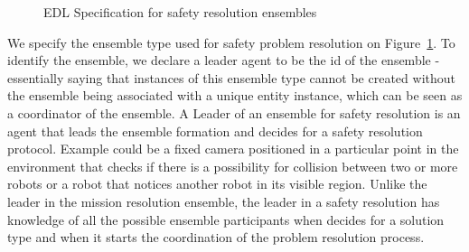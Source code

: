 \documentclass[journal]{IEEEtran}
\theoremstyle{definition}
\newcommand\patrizio[1]{\nb{Patrizio}{#1}}
\begin{document}
\begin{center}
\begin{figure}[!h]
 
%  
 \caption{EDL Specification for safety resolution ensembles} 
 \label {lstSafety}
 \vspace{-0.8cm}
\end{figure} 
\end{center} 
We  specify the ensemble  type  used  for  safety  problem resolution on Figure~\ref{lstSafety}. To identify the ensemble, we declare a leader  agent  to  be  the  id  of  the  ensemble - essentially saying that instances of this ensemble type cannot be created without the ensemble being associated with a unique entity instance, which can be seen as a coordinator of the ensemble. 
A Leader of an ensemble for safety resolution is an agent that leads the ensemble formation and decides for a safety resolution protocol.
Example could be a fixed camera positioned in a particular point in the environment that checks if there is a possibility for collision between two or more robots or a robot that notices another robot in its visible region. Unlike the leader in the mission resolution ensemble, the leader in a safety resolution has knowledge of all the possible ensemble participants when decides for a solution type and when it starts the coordination of the problem resolution process.
\end{document}
